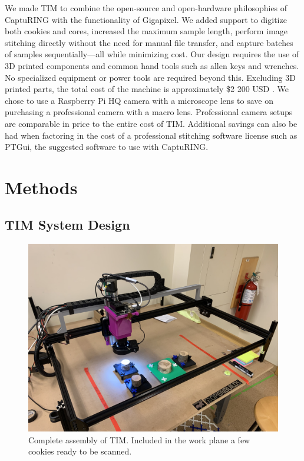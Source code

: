 \documentclass[a4paper,12pt]{article}
\begin{document}
We made TIM to combine the open-source and open-hardware philosophies of CaptuRING with the functionality of Gigapixel.
We added support to digitize both cookies and cores, increased the maximum sample length, perform image stitching directly without the need for manual file transfer, and capture batches of samples sequentially---all while minimizing cost.
Our design requires the use of 3D printed components and common hand tools such as allen keys and wrenches. No specialized equipment or power tools are required beyond this.
Excluding 3D printed parts, the total cost of the machine is approximately \$2 200 USD \citep[compared to the \$70 000 USD of the Gigapixel,][]{griffin_gigapixel_2021}.
We chose to use a Raspberry Pi HQ camera with a microscope lens to save on purchasing a professional camera with a macro lens. Professional camera setups are comparable in price to the entire cost of TIM.
Additional savings can also be had when factoring in the cost of a professional stitching software license such as PTGui, the suggested software to use with CaptuRING. 

\section{Methods}

\subsection{TIM System Design} %

\begin{figure}
  \centering
  \includegraphics[height=0.5\linewidth]{../content/tina.jpg}
  \caption{Complete assembly of TIM. Included in the work plane a few cookies ready to be scanned.}
  \label{fig:tim_assembled}
\end{figure}
\end{document}
